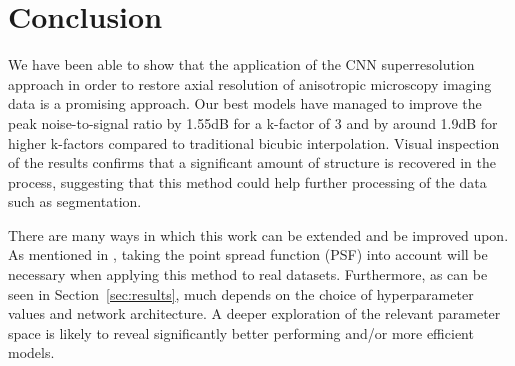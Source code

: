 \documentclass[a4paper, 12pt]{article} %
\begin{document}
\section{Conclusion}
We have been able to show that the application of the CNN superresolution approach in order to restore axial resolution of anisotropic microscopy imaging data is a promising approach. Our best models have managed to improve the peak noise-to-signal ratio by 1.55dB for a k-factor of 3 and by around 1.9dB for higher k-factors compared to traditional bicubic interpolation. Visual inspection of the results confirms that a significant amount of structure is recovered in the process, suggesting that this method could help further processing of the data such as segmentation.

There are many ways in which this work can be extended and be improved upon. As mentioned in \citet{WEIGERT2017}, taking the point spread function (PSF) into account will be necessary when applying this method to real datasets. Furthermore, as can be seen in Section~\ref{sec:results}, much depends on the choice of hyperparameter values and network architecture. A deeper exploration of the relevant parameter space is likely to reveal significantly better performing and/or more efficient models.







\end{document}
